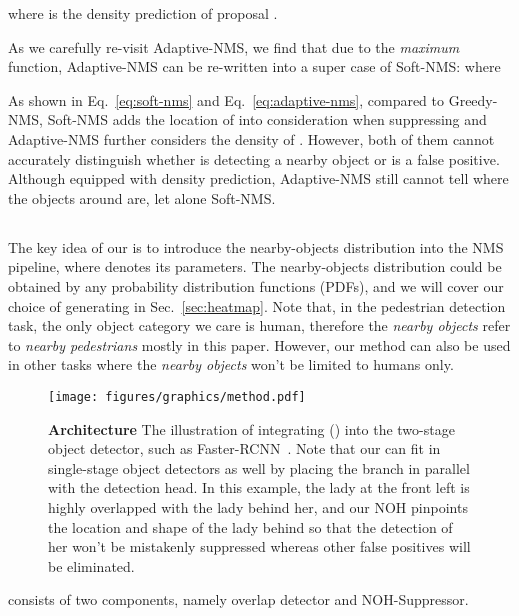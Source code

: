 \documentclass[sigconf]{acmart}
\begin{document}
where  is the density prediction of proposal .

As we carefully re-visit Adaptive-NMS, we find that due to the \textit{maximum} function, Adaptive-NMS can be re-written into a super case of Soft-NMS:
 where
 
As shown in Eq.~\ref{eq:soft-nms} and Eq.~\ref{eq:adaptive-nms}, compared to Greedy-NMS, Soft-NMS adds the location of  into consideration when suppressing  and Adaptive-NMS further considers the density of . However, both of them cannot accurately distinguish whether  is detecting a nearby object or  is a false positive. Although equipped with density prediction, Adaptive-NMS still cannot tell where the objects around  are, let alone Soft-NMS.

\subsection{\nmsname{}}
\label{sec:nms}
The key idea of our \nmsname{} is to introduce the nearby-objects distribution  into the NMS pipeline, where  denotes its parameters. The nearby-objects distribution could be obtained by any probability distribution functions (PDFs), and we will cover our choice of generating  in Sec.~\ref{sec:heatmap}. Note that, in the pedestrian detection task, the only object category we care is human, therefore the \textit{nearby objects} refer to \textit{nearby pedestrians} mostly in this paper. However, our method can also be used in other tasks where the \textit{nearby objects} won't be limited to humans only.

\begin{figure*}[t]
\begin{center}
\texttt{[image: figures/graphics/method.pdf]}
\end{center}
\caption{\textbf{Architecture} {\normalfont The illustration of integrating \heatmapname{} (\heatmapnameshort{}) into the two-stage object detector, such as Faster-RCNN~\cite{faster-rcnn}. Note that our \heatmapnameshort{} can fit in single-stage object detectors as well by placing the \heatmapnameshort{} branch in parallel with the detection head. In this example, the lady at the front left is highly overlapped with the lady behind her, and our NOH pinpoints the location and shape of the lady behind so that the detection of her won't be mistakenly suppressed whereas other false positives will be eliminated.}}
\label{fig:architecture}
\end{figure*}
 \nmsname{} consists of two components, namely overlap detector and NOH-Suppressor. 
\end{document}
